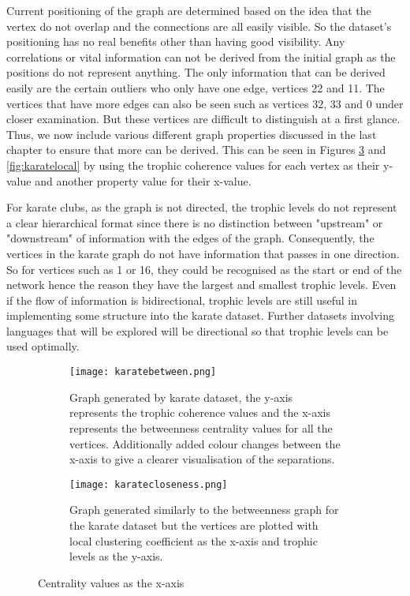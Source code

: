 Current positioning of the graph are determined based on the idea that the vertex do not overlap and the connections are all easily visible. So the dataset's positioning has no real benefits other than having good visibility. Any correlations or vital information can not be derived from the initial graph as the positions do not represent anything. The only information that can be derived easily are the certain outliers who only have one edge, vertices 22 and 11. The vertices that have more edges can also be seen such as vertices 32, 33 and 0 under closer examination. But these vertices are difficult to distinguish at a first glance. Thus, we now include various different graph properties discussed in the last chapter to ensure that more can be derived. This can be seen in Figures \ref{fig:karatecentrality} and \ref{fig:karatelocal} by using the trophic coherence values for each vertex as their y-value and another property value for their x-value.

For karate clubs, as the graph is not directed, the trophic levels do not represent a clear hierarchical format since there is no distinction between "upstream" or "downstream" of information with the edges of the graph. Consequently, the vertices in the karate graph do not have information that passes in one direction. So for vertices such as 1 or 16, they could be recognised as the start or end of the network hence the reason they have the largest and smallest trophic levels. Even if the flow of information is bidirectional, trophic levels are still useful in implementing some structure into the karate dataset. Further datasets involving languages that will be explored will be directional so that trophic levels can be used optimally.

\begin{figure}[H]
\centering
\begin{subfigure}{.45\textwidth}
	\texttt{[image: karatebetween.png]}
	\caption{Graph generated by karate dataset, the y-axis represents the trophic coherence values and the x-axis represents the betweenness centrality values for all the vertices. Additionally added colour changes between the x-axis to give a clearer visualisation of the separations.}
	\label{fig:karatea}
\end{subfigure}
\hfill
\begin{subfigure}{.45\textwidth}
	\texttt{[image: karatecloseness.png]}
	\caption{Graph generated similarly to the betweenness graph for the karate dataset but the vertices are plotted with local clustering coefficient as the x-axis and trophic levels as the y-axis.}
	\label{fig:karateb}
\end{subfigure}
\caption{Centrality values as the x-axis}
\label{fig:karatecentrality}
\end{figure}

